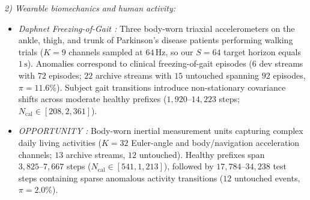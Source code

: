 \noindent\emph{2) Wearable biomechanics and human activity:}
\begin{itemize}[leftmargin=*, nosep, itemsep=1.5pt]
    \item \emph{Daphnet Freezing-of-Gait \cite{bachlin2010wearable}:} Three body-worn triaxial accelerometers on the ankle, thigh, and trunk of Parkinson's disease patients performing walking trials ($K{=}9$ channels sampled at $64\,\text{Hz}$, so our $S{=}64$ target horizon equals $1\,\text{s}$). Anomalies correspond to clinical freezing-of-gait episodes ($6$ dev streams with $72$ episodes; $22$ archive streams with $15$ untouched spanning $92$ episodes, $\pi{=}11.6\%$). Subject gait transitions introduce non-stationary covariance shifts across moderate healthy prefixes ($1{,}920\text{--}14{,}223$ steps; $N_{\text{cal}}\in[208,2{,}361]$).
    \item \emph{OPPORTUNITY \cite{roggen2010collecting}:} Body-worn inertial measurement units capturing complex daily living activities ($K{=}32$ Euler-angle and body/navigation acceleration channels; $13$ archive streams, $12$ untouched). Healthy prefixes span $3{,}825\text{--}7{,}667$ steps ($N_{\text{cal}}\in[541,1{,}213]$), followed by $17{,}784\text{--}34{,}238$ test steps containing sparse anomalous activity transitions ($12$ untouched events, $\pi{=}2.0\%$).
\end{itemize}

